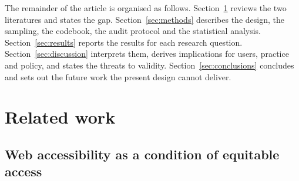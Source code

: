 \documentclass[]{interact}
\begin{document}
The remainder of the article is organised as follows. Section~\ref{sec:related} reviews the two literatures and states the gap. Section~\ref{sec:methods} describes the design, the sampling, the codebook, the audit protocol and the statistical analysis. Section~\ref{sec:results} reports the results for each research question. Section~\ref{sec:discussion} interprets them, derives implications for users, practice and policy, and states the threats to validity. Section~\ref{sec:conclusions} concludes and sets out the future work the present design cannot deliver.

\section{Related work}\label{sec:related}

\subsection{Web accessibility as a condition of equitable access}\label{sec:related-a11y}
\end{document}
